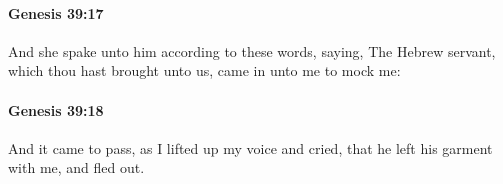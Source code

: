 		\paragraph{Genesis 39:17} %
			\label{GENESIS-39-17}

			And she spake unto him according to these words, saying, The Hebrew servant, which thou hast brought unto us, came in unto me to mock me:


		\paragraph{Genesis 39:18} %
			\label{GENESIS-39-18}

			And it came to pass, as I lifted up my voice and cried, that he left his garment with me, and fled out.


